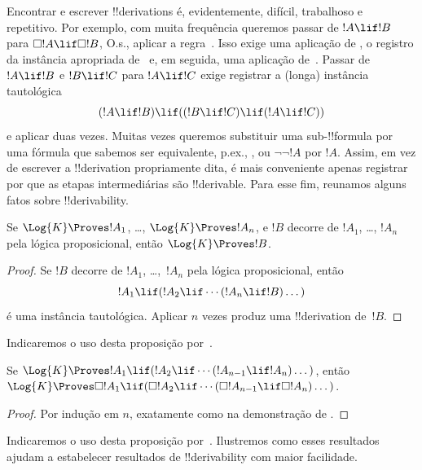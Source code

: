 \documentclass[../../../include/open-logic-section]{subfiles}
\begin{document}


Encontrar e escrever !!{derivation}s é, evidentemente, difícil,
trabalhoso e repetitivo. Por exemplo, com muita frequência queremos
passar de $!A \lif !B$ para $\Box !A \lif \Box !B$, O.s.\@, aplicar a
regra~\RK. Isso exige uma aplicação de \Nec, o registro da instância
apropriada de~ e, em seguida, uma aplicação de~\MP. Passar de
$!A \lif !B$ e $!B \lif !C$ para $!A \lif !C$ exige registrar a
(longa) instância tautológica
\[
(!A \lif !B) \lif ((!B \lif !C) \lif (!A \lif !C))
\]
e aplicar \MP{} duas vezes. Muitas vezes queremos substituir uma
sub-!!{formula} por uma fórmula que sabemos ser equivalente, p.ex., , ou $\lnot\lnot !A$ por
$!A$. Assim, em vez de escrever a !!{derivation} propriamente dita, é
mais conveniente apenas registrar por que as etapas intermediárias
são !!{derivable}. Para esse fim, reunamos alguns fatos sobre
!!{derivability}.

\begin{prop}
  Se $\Log{K} \Proves !A_1$, \dots, $\Log{K} \Proves !A_n$, e $!B$
  decorre de $!A_1$, \dots, $!A_n$ pela lógica proposicional, então
  $\Log{K} \Proves !B$.
\end{prop}

\begin{proof}
  Se $!B$ decorre de $!A_1$, \dots,~$!A_n$ pela lógica proposicional, então
  \[
  !A_1 \lif (!A_2 \lif \cdots (!A_n \lif !B)\dots)
  \]
  é uma instância tautológica. Aplicar \MP{} $n$ vezes produz uma
  !!{derivation} de~$!B$.
\end{proof}

Indicaremos o uso desta proposição por~\PL.

\begin{prop}
  Se $\Log{K} \Proves !A_1 \lif (!A_2 \lif \cdots (!A_{n-1} \lif
  !A_n)\dots)$, então $\Log{K} \Proves \Box !A_1 \lif (\Box !A_2 \lif
  \cdots (\Box !A_{n-1} \lif \Box !A_n)\dots)$.
\end{prop}

\begin{proof}
  Por indução em $n$, exatamente como na demonstração de
  .
\end{proof}

Indicaremos o uso desta proposição por~\RK. Ilustremos como esses
resultados ajudam a estabelecer resultados de !!{derivability} com
maior facilidade.
\end{document}
